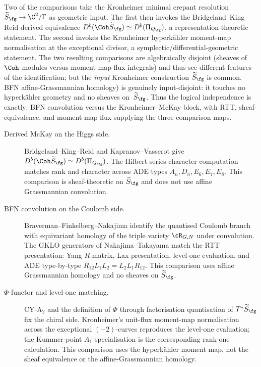 \begin{remark}
\label{rem:bfn-ade-input-dependency}
Two of the comparisons take the Kronheimer minimal crepant resolution
$\widetilde{S}_\fg \to \C^2/\Gamma$ as geometric input. The first
then invokes the Bridgeland--King--Reid derived equivalence
$D^b(\Coh \widetilde{S}_\fg) \simeq D^b(\Pi_{Q_\fg})$, a
representation-theoretic statement. The second invokes the Kronheimer
hyperk\"ahler moment-map normalisation at the exceptional divisor,
a symplectic/differential-geometric statement. The two resulting
comparisons are algebraically disjoint (sheaves of $\Coh$-modules
versus moment-map flux integrals) and thus see different features
of the identification; but the \emph{input} Kronheimer construction
$\widetilde{S}_\fg$ is common. BFN affine-Grassmannian
homology) is genuinely input-disjoint: it touches no hyperk\"ahler
geometry and no sheaves on~$\widetilde{S}_\fg$. Thus the logical
independence is exactly: BFN convolution versus the Kronheimer--McKay
block, with RTT, sheaf-equivalence, and moment-map flux supplying the
three comparison maps.
\end{remark}


\begin{description}
\item[Derived McKay on the Higgs side.]
Bridgeland--King--Reid and Kapranov--Vasserot give
$D^b(\Coh \widetilde{S}_\fg) \simeq D^b(\Pi_{Q_\fg})$.
The Hilbert-series character computation matches rank and character
across ADE types $A_n, D_n, E_6, E_7, E_8$. This comparison is
sheaf-theoretic on $\widetilde{S}_\fg$ and does not use affine
Grassmannian convolution.

\item[BFN convolution on the Coulomb side.]
Braverman--Finkelberg--Nakajima identify the quantised Coulomb branch
with equivariant homology of the triple variety $\cR_{G,N}$ under
convolution. The GKLO generators of Nakajima--Takayama match the RTT
presentation: Yang $R$-matrix, Lax presentation, level-one evaluation, and ADE
type-by-type $R_{12}L_1L_2=L_2L_1R_{12}$. This comparison uses affine
Grassmannian homology and no sheaves on $\widetilde{S}_\fg$.

\item[$\Phi$-functor and level-one matching.]
CY-A$_2$ and the definition of $\Phi$ through factorisation
quantisation of $T^*\widetilde{S}_\fg$ fix the chiral side.
Kronheimer's unit-flux moment-map normalisation across the exceptional
$(-2)$-curves reproduces the level-one evaluation; the Kummer-point
$A_1$ specialisation is the corresponding rank-one calculation. This comparison uses the
hyperk\"ahler moment map, not the sheaf equivalence or
the affine-Grassmannian homology.
\end{description}

